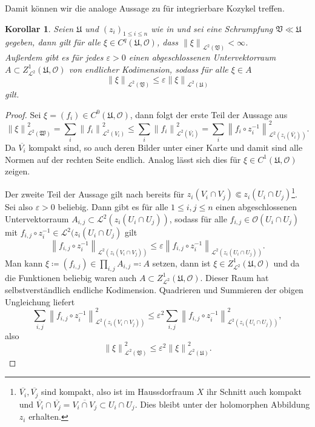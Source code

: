 \documentclass[11pt,a4paper,toc=bibliography]{scrartcl}
\theoremstyle{def}
\theoremstyle{thm}
\newtheorem{koro}[defi]{Korollar}
\theoremstyle{remark}
\newcommand*{\norm}[1]{\left\lVert#1\right\rVert} %
\begin{document}
Damit können wir die analoge Aussage zu  für integrierbare Kozykel treffen.

\begin{koro}
Seien $\mathfrak{U}$ und $(z_i)_{1\leq i\leq n}$ wie in  und sei eine Schrumpfung $\mathfrak{V}\ll \mathfrak{U}$ gegeben, dann gilt für alle $\xi\in C^q(\mathfrak{U},\mathcal{O})$, dass $\norm{\xi}_{\mathcal{L}^2(\mathfrak{V})}<\infty$. \\
Außerdem gibt es für jedes $\varepsilon>0$ einen abgeschlossenen Untervektorraum $A\subset Z^1_{\mathcal{L}^2}(\mathfrak{U},\mathcal{O})$ von endlicher Kodimension, sodass für alle $\xi\in A$
\[
\norm{\xi}_{\mathcal{L}^2(\mathfrak{V})}\leq \varepsilon \norm{\xi}_{\mathcal{L}^2(\mathfrak{U})}
\]
gilt.

\end{koro}
\begin{proof}
  Sei $\xi=(f_i)\in C^0(\mathfrak{U},\mathcal{O})$, dann folgt der erste Teil der Aussage aus
    \[\norm{\xi}_{\mathcal{L}^2(\mathfrak{W})}^2=\sum_i \norm{f_i}_{\mathcal{L}^2(V_i)}^2\leq\sum_i \norm{f_i}_{\mathcal{L}^2(\overline{V_i})}^2=\sum_i \norm{f_i\circ z^{-1}_i}^2_{\mathcal{L}^2(z_i(\overline{V_i}))}.\]
    Da $\overline{V_i}$ kompakt sind, so auch deren Bilder unter einer Karte und damit sind alle Normen auf der rechten Seite endlich. Analog lässt sich dies für $\xi\in C^1(\mathfrak{U},\mathcal{O})$ zeigen.
    
    Der zweite Teil der Aussage gilt nach  bereits für $z_i(V_i\cap V_j)\Subset z_i(U_i\cap U_j)$\footnote{
                        $\overline{V_i},\overline{V_j}$ sind kompakt, also ist im Haussdorfraum $X$ ihr Schnitt auch kompakt und $\overline{V_i}\cap\overline{V_j}=\overline{V_i\cap V_j}\subset U_i\cap U_j.$ Dies bleibt unter der holomorphen Abbildung $z_i$ erhalten.
                        }.
    Sei also $\varepsilon>0$ beliebig. Dann gibt es für alle $1\leq i,j\leq n$ einen abgeschlossenen Untervektorraum $A_{i,j}\subset \mathcal{L}^2(z_i(U_i\cap U_j))$, sodass für alle $f_{i,j}\in \mathcal{O}(U_i\cap U_j)$ mit $f_{i,j}\circ z_i^{-1}\in \mathcal{L}^2(z_i(U_i\cap U_j)$ gilt
    \[
    \norm{f_{i,j}\circ z_i^{-1}}_{\mathcal{L}^2(z_i(V_i\cap V_j))}\leq \varepsilon \norm{f_{i,j}\circ z_i^{-1}}_{\mathcal{L}^2(z_i(U_i\cap U_j))}.
    \]
    Man kann $\xi\coloneqq(f_{i,j})\in \prod_{i,j}A_{i,j}\eqqcolon A$ setzen, dann ist $\xi\in Z^1_{\mathcal{L}^2}(\mathfrak{U},\mathcal{O})$ und da die Funktionen beliebig waren auch $A\subset Z^1_{\mathcal{L}^2}(\mathfrak{U},\mathcal{O}) $. Dieser Raum hat selbstverständlich endliche Kodimension. Quadrieren und Summieren der obigen Ungleichung liefert
    \[
    \sum_{i,j}\norm{f_{i,j}\circ z_i^{-1}}_{\mathcal{L}^2(z_i(V_i\cap V_j))}^2\leq \varepsilon^2 \sum_{i,j} \norm{f_{i,j}\circ z_i^{-1}}_{\mathcal{L}^2(z_i(U_i\cap U_j))}^2,
    \]
    also
    \[
    \norm{\xi}_{\mathcal{L}^2(\mathfrak{V})}^2\leq \varepsilon^2 \norm{\xi}^2_{\mathcal{L}^2(\mathfrak{U})}.
    \]
\end{proof}
\end{document}
